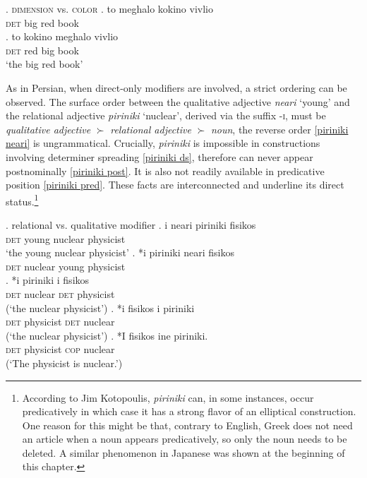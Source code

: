 \ex. \textsc{dimension} vs. \textsc{color}
\ag. to meghalo kokino vivlio\\
\textsc{det} big red book\\
\bg. to kokino meghalo vivlio\\
\textsc{det} red big book\\
`the big red book’

As in Persian, when direct-only modifiers are involved, a strict ordering can be observed. The surface order between the qualitative adjective \textit{neari} `young' and the relational adjective \textit{piriniki} `nuclear’, derived via the suffix -\textsc{i}, must be \textit{qualitative adjective} $\succ$ \textit{relational adjective} $\succ$ \textit{noun}, the reverse order \ref{piriniki neari} is ungrammatical. Crucially, \textit{piriniki} is impossible in constructions involving determiner spreading \ref{piriniki ds}, therefore can never appear postnominally \ref{piriniki post}. It is also not readily available in predicative position \ref{piriniki pred}. These facts are interconnected and underline its direct status.\footnote{According to Jim Kotopoulis, \textit{piriniki} can, in some instances, occur predicatively in which case it has a strong flavor of an elliptical construction. One reason for this might be that, contrary to English, Greek does not need an article when a noun appears predicatively, so only the noun needs to be deleted. A similar phenomenon in Japanese was shown at the beginning of this chapter.}  

\ex. relational vs. qualitative modifier
\ag. i neari piriniki fisikos\\
\textsc{det} young nuclear physicist\\
`the young nuclear physicist'
\bg. *i piriniki neari fisikos\\
\textsc{det} nuclear young physicist \label{piriniki neari}\\
\cg. *i piriniki i fisikos\\
\textsc{det} nuclear \textsc{det} physicist \label{piriniki ds}\\
(`the nuclear physicist’)
\dg. *i fisikos i piriniki\\
\textsc{det} physicist \textsc{det} nuclear \label{piriniki post}\\
(`the nuclear physicist’)
\eg. *I fisikos ine piriniki.\\
\textsc{det} physicist \textsc{cop} nuclear\\
(`The physicist is nuclear.’) \label{piriniki pred}

